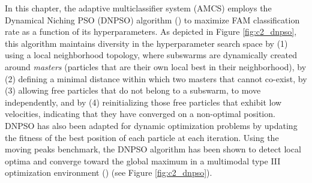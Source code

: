 \begin{figure*}[t]
  \centering
	\caption{Evolution of DNPSO particles for different changes in a type III 
optimization environment using the 2D multipeak benchmark problem (\cite{branke99}).
In a video-based face recognition application for instance, this could be the classification rate landscape in a 2D hyperparameter space.
Subswarms (shapes: circle, rectangle, etc.) are created dynamically around the \emph{masters} -- particles that detected local optima.
Subswarms converge toward the local optima detected for the objective function.
Free particles (stars), that are not associated to any subswarms, are free to explore the optimization space using only their cognitive influence.
At different times $t$, the personal best of each particles is reevaluated to accommodate changes that may occur on the objective function}
	\label{fig:c2_dnpso}
\end{figure*}

In this chapter, the adaptive multiclassifier system (AMCS) employs the Dynamical Niching PSO (DNPSO) algorithm (\cite{nickabadi08_2}) to maximize FAM classification rate as a function of its hyperparameters.
As depicted in Figure \ref{fig:c2_dnpso}, this algorithm maintains diversity in the hyperparameter search space by (1) using a local neighborhood topology, where subswarms are dynamically created around \emph{masters} (particles that are their own local best in their neighborhood), by (2) defining a minimal distance within which two masters that cannot co-exist, by (3) allowing free particles that do not belong to a subswarm, to move independently, and by (4) reinitializing those free particles that exhibit low velocities, indicating that they have converged on a non-optimal position.
DNPSO has also been adapted for dynamic optimization problems by updating the fitness of the best position of each particle at each iteration.
Using the moving peaks benchmark, the DNPSO algorithm has been shown to detect local optima and converge toward the global maximum in a multimodal type III optimization environment (\cite{nickabadi08_2}) (see Figure \ref{fig:c2_dnpso}).


